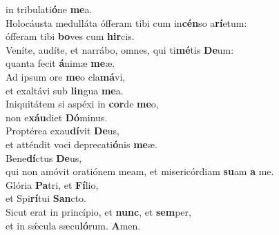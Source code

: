 \oddverse in tribulati\textbf{ó}ne \textbf{me}a.\\
\evenverse Holocáusta medulláta ófferam tibi cum in\textbf{cén}so a\textbf{rí}etum:~\*\\
\evenverse ófferam tibi \textbf{bo}ves cum \textbf{hir}cis.\\
\oddverse Veníte, audíte, et narrábo, omnes, qui ti\textbf{mé}tis \textbf{De}um:~\*\\
\oddverse quanta fecit \textbf{á}nimæ \textbf{me}æ.\\
\evenverse Ad ipsum ore \textbf{me}o cla\textbf{má}vi,~\*\\
\evenverse et exaltávi sub \textbf{lin}gua \textbf{me}a.\\
\oddverse Iniquitátem si aspéxi in \textbf{cor}de \textbf{me}o,~\*\\
\oddverse non e\textbf{xáu}diet \textbf{Dó}minus.\\
\evenverse Proptérea exau\textbf{dí}vit \textbf{De}us,~\*\\
\evenverse et atténdit voci deprecati\textbf{ó}nis \textbf{me}æ.\\
\oddverse Bene\textbf{dí}ctus \textbf{De}us,~\*\\
\oddverse qui non amóvit oratiónem meam, et misericórdiam \textbf{su}am \textbf{a} me.\\
\evenverse Glória \textbf{Pa}tri, et \textbf{Fí}lio,~\*\\
\evenverse et Spi\textbf{rí}tui \textbf{San}cto.\\
\oddverse Sicut erat in princípio, et \textbf{nunc}, et \textbf{sem}per,~\*\\
\oddverse et in sǽcula sæcu\textbf{ló}rum. \textbf{A}men.\\
